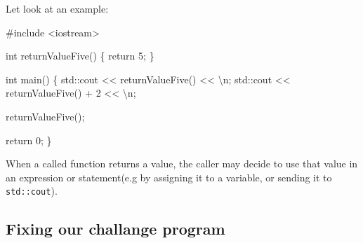\documentclass[
  letterpaper,
  DIV=11,
  numbers=noendperiod]{scrreprt}
\newenvironment{Shaded}{\begin{snugshade}}{\end{snugshade}}
\newcommand{\CommentTok}[1]{\textcolor[rgb]{0.37,0.37,0.37}{#1}}
\newcommand{\DecValTok}[1]{\textcolor[rgb]{0.68,0.00,0.00}{#1}}
\newcommand{\ErrorTok}[1]{\textcolor[rgb]{0.68,0.00,0.00}{#1}}
\newcommand{\FunctionTok}[1]{\textcolor[rgb]{0.28,0.35,0.67}{#1}}
\newcommand{\NormalTok}[1]{\textcolor[rgb]{0.00,0.23,0.31}{#1}}
\newcommand{\SpecialCharTok}[1]{\textcolor[rgb]{0.37,0.37,0.37}{#1}}
\newcommand{\StringTok}[1]{\textcolor[rgb]{0.13,0.47,0.30}{#1}}
\begin{document}
Let look at an example:

\begin{Shaded}
\begin{Highlighting}[]
\CommentTok{\#include \textless{}iostream\textgreater{}}

\NormalTok{int }\FunctionTok{returnValueFive}\NormalTok{()}
\NormalTok{\{}
\NormalTok{  return }\DecValTok{5}\NormalTok{;}
\NormalTok{\}}

\NormalTok{int }\FunctionTok{main}\NormalTok{()}
\NormalTok{\{}
\NormalTok{  std}\SpecialCharTok{::}\NormalTok{cout }\SpecialCharTok{\textless{}}\ErrorTok{\textless{}} \FunctionTok{returnValueFive}\NormalTok{() }\SpecialCharTok{\textless{}}\ErrorTok{\textless{}} \StringTok{\textquotesingle{}}\SpecialCharTok{\textbackslash{}n}\StringTok{\textquotesingle{}}\NormalTok{;}
\NormalTok{  std}\SpecialCharTok{::}\NormalTok{cout }\SpecialCharTok{\textless{}}\ErrorTok{\textless{}} \FunctionTok{returnValueFive}\NormalTok{() }\SpecialCharTok{+} \DecValTok{2} \SpecialCharTok{\textless{}}\ErrorTok{\textless{}} \StringTok{\textquotesingle{}}\SpecialCharTok{\textbackslash{}n}\StringTok{\textquotesingle{}}\NormalTok{;}
  
  \FunctionTok{returnValueFive}\NormalTok{();}
  
\NormalTok{  return }\DecValTok{0}\NormalTok{;}
\NormalTok{\}}
\end{Highlighting}
\end{Shaded}

\begin{tcolorbox}[enhanced jigsaw, toprule=.15mm, rightrule=.15mm, opacityback=0, breakable, leftrule=.75mm, colback=white, colframe=quarto-callout-tip-color-frame, arc=.35mm, left=2mm, bottomrule=.15mm]
\begin{minipage}[t]{5.5mm}
\textcolor{quarto-callout-tip-color}{\faLightbulb}
\end{minipage}%
\begin{minipage}[t]{\textwidth - 5.5mm}

When a called function returns a value, the caller may decide to use
that value in an expression or statement(e.g by assigning it to a
variable, or sending it to \texttt{std::cout}).

\end{minipage}%
\end{tcolorbox}

\hypertarget{fixing-our-challange-program}{%
\subsection{Fixing our challange
program}\label{fixing-our-challange-program}}
\end{document}
